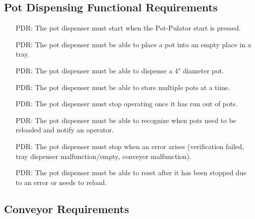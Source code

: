 \documentclass[12pt]{article}
\newcounter{pdreqnum} %
\newcounter{reqnum} %
\begin{document}
  \subsection{Pot Dispensing Functional Requirements}
  
  \noindent \begin{itemize}
  
  \item[PDR\refstepcounter{pdreqnum}\thepdreqnum \label{R_Pot0}:] {The pot dispenser must
      start when the Pot-Pulator start is pressed.}
  
  \item[PDR\refstepcounter{pdreqnum}\thepdreqnum \label{R_Pot1}:] {The pot dispenser must
      be able to place a pot into an empty place in a tray.}
  
  \item[PDR\refstepcounter{pdreqnum}\thepdreqnum \label{R_Pot2}:] {The pot dispenser must
      be able to dispense a 4" diameter pot.}
  
  \item[PDR\refstepcounter{pdreqnum}\thepdreqnum \label{R_Pot3}:] {The pot dispenser must
      be able to store multiple pots at a time.}
  
  \item[PDR\refstepcounter{pdreqnum}\thepdreqnum \label{R_Pot6}:] {The pot dispenser must
      stop operating once it has run out of pots.}
  
  \item[PDR\refstepcounter{pdreqnum}\thepdreqnum \label{R_Pot7}:] {The pot dispenser must
      be able to recognize when pots need to be reloaded and notify an operator.}
  
  \item[PDR\refstepcounter{pdreqnum}\thepdreqnum \label{R_Pot8}:] {The pot dispenser must
      stop when an error arises (verification failed, tray dispenser malfunction/empty, conveyor
      malfunction).}
  
  \item[PDR\refstepcounter{pdreqnum}\thepdreqnum \label{R_Pot9}:] {The pot dispenser must
      be able to reset after it has been stopped due to an error or needs to reload.}
  
  \end{itemize}
  
  \subsection{Conveyor Requirements}
  
\end{document}
